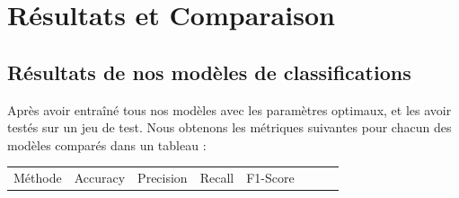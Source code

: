 \documentclass[11pt]{article}
\begin{document}
\section{Résultats et Comparaison}\label{ruxe9sultats-et-comparaison}

\subsection{Résultats de nos modèles de
  classifications}\label{ruxe9sultats-de-nos-moduxe8les-de-classifications}

Après avoir entraîné tous nos modèles avec les paramètres optimaux, et
les avoir testés sur un jeu de test. Nous obtenons les métriques
suivantes pour chacun des modèles comparés dans un tableau :

\begin{longtable}[]{@{}
  >{\raggedright\arraybackslash}p{}
  >{\centering\arraybackslash}p{}
  >{\centering\arraybackslash}p{}
  >{\centering\arraybackslash}p{}
  >{\centering\arraybackslash}p{}
  >{\centering\arraybackslash}p{}
  >{\centering\arraybackslash}p{}
  >{\centering\arraybackslash}p{}@{}}
  \toprule\noalign{}
  \begin{minipage}[b]{\linewidth}\raggedright
    Méthode
  \end{minipage} & \begin{minipage}[b]{\linewidth}\centering
                     Accuracy
                   \end{minipage} & \begin{minipage}[b]{\linewidth}\centering
                                      Precision
                                    \end{minipage} & \begin{minipage}[b]{\linewidth}\centering
                                                       Recall
                                                     \end{minipage} & \begin{minipage}[b]{\linewidth}\centering
                                                                        F1-Score
                                                                      \end{minipage} & \begin{minipage}[b]{\linewidth}\centering

\end{minipage}
\end{longtable}
\end{document}
